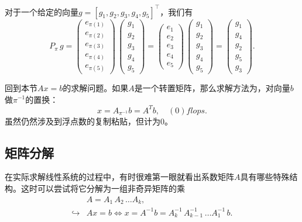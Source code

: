 对于一个给定的向量$g = \left[ g_{1}, g_{2}, g_{3}, g_{4}, g_{5} \right]^{\top}$，我们有
\begin{equation*}
  P_{\pi} \, g =
  \begin{pmatrix}
    e_{\pi(1)} \\
    e_{\pi(2)} \\
    e_{\pi(3)} \\
    e_{\pi(4)} \\
    e_{\pi(5)}
  \end{pmatrix}
  \,
  \begin{pmatrix}
    g_{1} \\
    g_{2} \\
    g_{3} \\
    g_{4} \\
    g_{5}
    \end{pmatrix}
    =
    \begin{pmatrix}
    e_{1} \\ e_{2} \\ e_{3} \\ e_{4} \\ e_{5}
    \end{pmatrix}
    \,
    \begin{pmatrix}
      g_{1} \\
      g_{2} \\
      g_{3} \\
      g_{4} \\
      g_{5}
      \end{pmatrix}
    = \begin{pmatrix}
    g_{1} \\ g_{4} \\ g_{2} \\ g_{5} \\ g_{3}
    \end{pmatrix}.
\end{equation*}

回到本节$Ax=b$的求解问题。如果$A$是一个转置矩阵，那么求解方法为，对向量$b$做$\pi^{-1}$的置换：
\begin{equation*}
  x = A_{\pi^{-1}} b = A^{T} b, \quad \left( 0 \right) flops.
\end{equation*}
虽然仍然涉及到浮点数的复制粘贴，但计为$0$。

\subsection{矩阵分解}
\label{sec:numlin-matrix-factorization}
在实际求解线性系统的过程中，有时很难第一眼就看出系数矩阵$A$具有哪些特殊结构。这时可以尝试将它分解为一组非奇异矩阵的乘
\begin{equation}
  \label{eq:numlin-matrix-factorization-fact-step}
\begin{split}
    & A = A_{1} \, A_{2} \, \ldots A_{k}, \\
    \hookrightarrow & A x = b \Leftrightarrow x = A^{-1} b
    = A_{k}^{-1} \, A_{k-1}^{-1} \, \ldots A_{1}^{-1} \, b.
\end{split}
\end{equation}

